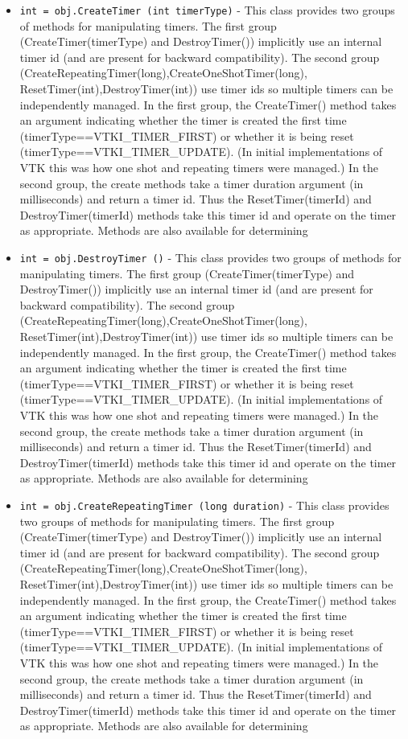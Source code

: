 \begin{itemize}
\item  \verb|int = obj.CreateTimer (int timerType)| -  This class provides two groups of methods for manipulating timers.  The
 first group (CreateTimer(timerType) and DestroyTimer()) implicitly use
 an internal timer id (and are present for backward compatibility). The
 second group (CreateRepeatingTimer(long),CreateOneShotTimer(long),
 ResetTimer(int),DestroyTimer(int)) use timer ids so multiple timers can
 be independently managed. In the first group, the CreateTimer() method
 takes an argument indicating whether the timer is created the first time
 (timerType==VTKI\_TIMER\_FIRST) or whether it is being reset
 (timerType==VTKI\_TIMER\_UPDATE). (In initial implementations of VTK this
 was how one shot and repeating timers were managed.) In the second
 group, the create methods take a timer duration argument (in
 milliseconds) and return a timer id. Thus the ResetTimer(timerId) and
 DestroyTimer(timerId) methods take this timer id and operate on the
 timer as appropriate. Methods are also available for determining

\item  \verb|int = obj.DestroyTimer ()| -  This class provides two groups of methods for manipulating timers.  The
 first group (CreateTimer(timerType) and DestroyTimer()) implicitly use
 an internal timer id (and are present for backward compatibility). The
 second group (CreateRepeatingTimer(long),CreateOneShotTimer(long),
 ResetTimer(int),DestroyTimer(int)) use timer ids so multiple timers can
 be independently managed. In the first group, the CreateTimer() method
 takes an argument indicating whether the timer is created the first time
 (timerType==VTKI\_TIMER\_FIRST) or whether it is being reset
 (timerType==VTKI\_TIMER\_UPDATE). (In initial implementations of VTK this
 was how one shot and repeating timers were managed.) In the second
 group, the create methods take a timer duration argument (in
 milliseconds) and return a timer id. Thus the ResetTimer(timerId) and
 DestroyTimer(timerId) methods take this timer id and operate on the
 timer as appropriate. Methods are also available for determining

\item  \verb|int = obj.CreateRepeatingTimer (long duration)| -  This class provides two groups of methods for manipulating timers.  The
 first group (CreateTimer(timerType) and DestroyTimer()) implicitly use
 an internal timer id (and are present for backward compatibility). The
 second group (CreateRepeatingTimer(long),CreateOneShotTimer(long),
 ResetTimer(int),DestroyTimer(int)) use timer ids so multiple timers can
 be independently managed. In the first group, the CreateTimer() method
 takes an argument indicating whether the timer is created the first time
 (timerType==VTKI\_TIMER\_FIRST) or whether it is being reset
 (timerType==VTKI\_TIMER\_UPDATE). (In initial implementations of VTK this
 was how one shot and repeating timers were managed.) In the second
 group, the create methods take a timer duration argument (in
 milliseconds) and return a timer id. Thus the ResetTimer(timerId) and
 DestroyTimer(timerId) methods take this timer id and operate on the
 timer as appropriate. Methods are also available for determining


\end{itemize}
